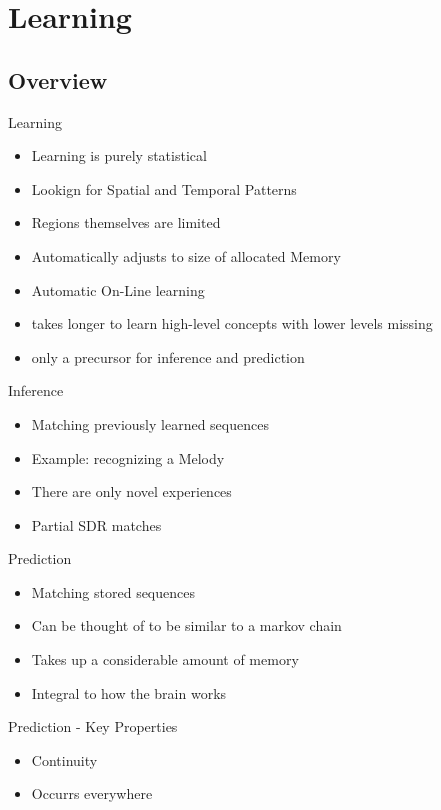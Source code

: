\section{Learning}

\subsection{Overview}

\begin{frame}[c]{Learning}
    \begin{itemize}[<+(1)->]
        \item Learning is purely statistical
        \item Lookign for Spatial and Temporal Patterns
        \item Regions themselves are limited
        \item Automatically adjusts to size of allocated Memory
        \item Automatic On-Line learning
        \item takes longer to learn high-level concepts with lower levels missing
        \item only a precursor for inference and prediction
    \end{itemize}
\end{frame}


\begin{frame}[c]{Inference}
    \Large
    \begin{itemize}[<+(1)->]
        \item Matching previously learned sequences
        \item Example: recognizing a Melody
        \item There are only novel experiences
        \item Partial SDR matches
    \end{itemize}
\end{frame}


\begin{frame}[c]{Prediction}
    \Large
    \begin{itemize}[<+(1)->]
        \item Matching stored sequences
        \item Can be thought of to be similar to a markov chain
        \item Takes up a considerable amount of memory
        \item Integral to how the brain works
    \end{itemize}
\end{frame}


\begin{frame}[c]{Prediction - Key Properties}
    \begin{itemize}[<+(1)->]
        \item Continuity
        \item Occurrs everywhere
    \end{itemize}
\end{frame}





